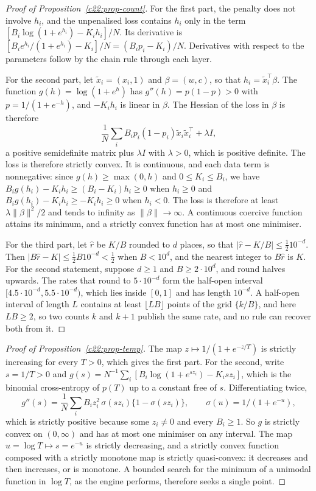 \begin{proof}[Proof of Proposition~\ref{c22:prop-count}]
For the first part, the penalty does not involve $h_i$, and the unpenalised loss contains $h_i$ only in
the term $[B_i\log(1+e^{h_i})-K_ih_i]/N$. Its derivative is $[B_ie^{h_i}/(1+e^{h_i})-K_i]/N=(B_ip_i-K_i)/N$.
Derivatives with respect to the parameters follow by the chain rule through each layer.

For the second part, let $\tilde x_i=(x_i,1)$ and $\beta=(w,c)$, so that $h_i=\tilde x_i^\top\beta$. The function
$g(h)=\log(1+e^h)$ has $g''(h)=p(1-p)>0$ with $p=1/(1+e^{-h})$, and $-K_ih_i$ is linear in $\beta$. The Hessian of
the loss in $\beta$ is therefore
\[\frac1N\sum_iB_ip_i(1-p_i)\tilde x_i\tilde x_i^\top+\lambda I,\]
a positive semidefinite matrix plus $\lambda I$ with $\lambda>0$, which is positive definite. The loss is therefore strictly
convex. It is continuous, and each data term is nonnegative: since $g(h)\ge\max(0,h)$ and $0\le K_i\le B_i$, we have
$B_ig(h_i)-K_ih_i\ge(B_i-K_i)h_i\ge0$ when $h_i\ge0$ and $B_ig(h_i)-K_ih_i\ge-K_ih_i\ge0$ when $h_i<0$. The loss is therefore
at least $\lambda\|\beta\|^2/2$ and tends to infinity as $\|\beta\|\to\infty$. A continuous coercive function attains its
minimum, and a strictly convex function has at most one minimiser.

For the third part, let $\hat r$ be $K/B$ rounded to $d$ places, so that $|\hat r-K/B|\le\frac12 10^{-d}$. Then
$|B\hat r-K|\le\frac12B10^{-d}<\frac12$ when $B<10^d$, and the nearest integer to $B\hat r$ is $K$. For the second
statement, suppose $d\ge1$ and $B\ge2\cdot10^d$, and round halves upwards. The rates that round to $5\cdot10^{-d}$ form the
half-open interval $[4.5\cdot10^{-d},5.5\cdot10^{-d})$, which lies inside $[0,1]$ and has length $10^{-d}$. A half-open
interval of length $L$ contains at least $\lfloor LB\rfloor$ points of the grid $\{k/B\}$, and here $LB\ge2$, so two counts
$k$ and $k+1$ publish the same rate, and no rule can recover both from it.
\end{proof}

\begin{proof}[Proof of Proposition~\ref{c22:prop-temp}]
The map $z\mapsto1/(1+e^{-z/T})$ is strictly increasing for every $T>0$, which gives the first part. For the
second, write $s=1/T>0$ and $g(s)=N^{-1}\sum_i[B_i\log(1+e^{sz_i})-K_isz_i]$, which is the binomial cross-entropy of
$p(T)$ up to a constant free of $s$. Differentiating twice,
\[g''(s)=\frac1N\sum_iB_iz_i^2\,\sigma(sz_i)\{1-\sigma(sz_i)\},\qquad\sigma(u)=1/(1+e^{-u}),\]
which is strictly positive because some $z_i\ne0$ and every $B_i\ge1$. So $g$ is strictly convex on $(0,\infty)$ and has at
most one minimiser on any interval. The map $u=\log T\mapsto s=e^{-u}$ is strictly decreasing, and a strictly
convex function composed with a strictly monotone map is strictly quasi-convex: it decreases and then increases,
or is monotone. A bounded search for the minimum of a unimodal function in $\log T$, as the engine performs,
therefore seeks a single point.
\end{proof}

